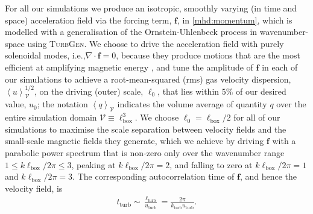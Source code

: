 \documentclass[12pt,twoside]{extreport}
\makeatletter
\newcommand{\mAve}[1]{\left\langle #1 \right\rangle} %
\newcommand{\mVector}[1]{\bm{#1}} %
\newcommand{\mVolume}{\ensuremath{\mathcal{V}}} %
\newcommand{\ie}{i.e.,\xspace} %
\providecommand{\DIFaddtex}[1]{{\protect\color{DIFgreen}\uwave{#1}}} %
\providecommand{\DIFdeltex}[1]{{\protect\color{DIFpurple}\sout{#1}}} %
\providecommand{\DIFaddbegin}{} %
\providecommand{\DIFaddend}{} %
\providecommand{\DIFdelbegin}{} %
\providecommand{\DIFdelend}{} %
\providecommand{\DIFadd}[1]{\texorpdfstring{\DIFaddtex{#1}}{#1}} %
\providecommand{\DIFdel}[1]{\texorpdfstring{\DIFdeltex{#1}}{}} %
\providecommand{\DIFscaledelfig}{0.5}
\newlength{\DIFdelgraphicswidth} %
\newlength{\DIFdelgraphicsheight} %
\providecommand{\DIFaddincludegraphics}[2][]{{\color{DIFgreen}\fbox{\DIFOincludegraphics[#1]{#2}}}} %
\providecommand{\DIFdelincludegraphics}[2][]{%
\sbox{\DIFdelgraphicsbox}{\DIFOincludegraphics[#1]{#2}}%
\settoboxwidth{\DIFdelgraphicswidth}{\DIFdelgraphicsbox} %
\settoboxtotalheight{\DIFdelgraphicsheight}{\DIFdelgraphicsbox} %
\scalebox{\DIFscaledelfig}{%
\parbox[b]{\DIFdelgraphicswidth}{\usebox{\DIFdelgraphicsbox}\\[-\baselineskip] \rule{\DIFdelgraphicswidth}{0em}}\llap{\resizebox{\DIFdelgraphicswidth}{\DIFdelgraphicsheight}{%
\setlength{\unitlength}{\DIFdelgraphicswidth}%
\begin{picture}(1,1)%
\thicklines\linethickness{2pt} %
{\color{DIFpurple}\put(0,0){\framebox(1,1){}}}%
{\color{DIFpurple}\put(0,0){\line( 1,1){1}}}%
{\color{DIFpurple}\put(0,1){\line(1,-1){1}}}%
\end{picture}%
}\hspace*{3pt}}} %
} %
\DeclareRobustCommand{\DIFaddbegin}{\DIFOaddbegin \let\includegraphics\DIFaddincludegraphics} %
\DeclareRobustCommand{\DIFaddend}{\DIFOaddend \let\includegraphics\DIFOincludegraphics} %
\DeclareRobustCommand{\DIFdelbegin}{\DIFOdelbegin \let\includegraphics\DIFdelincludegraphics} %
\DeclareRobustCommand{\DIFdelend}{\DIFOaddend \let\includegraphics\DIFOincludegraphics} %
\let\sout@orig\sout %
\renewcommand{\sout}[1]{\ifmmode\text{\sout@orig{\ensuremath{#1}}}\else\sout@orig{#1}\fi} %
\makeatother
\begin{document}
For all our simulations we produce an isotropic, smoothly varying (in time and space) acceleration field via the forcing term, $\mVector{f}$, in \autoref{mhd:momentum}, which is modelled with a generalisation of the Ornstein-Uhlenbeck process in wavenumber-space \citep{eswaran1988examination, schmidt2006numerical, schmidt2009numerical, federrath2010comparing, Federrath2022_TurbGen} using \textsc{TurbGen}. We choose to drive the acceleration field with purely solenoidal modes, \ie $\nabla\cdot\mVector{f} = 0$, because they produce motions that are the most efficient at amplifying magnetic energy \citep{federrath2011mach, federrath2014turbulent, martins2019kazantsev, chirakkara2021efficient}, and tune the amplitude of $\mVector{f}$ in each of our simulations to achieve a root-mean-squared (rms) gas velocity dispersion, $\mAve{u}_\mVolume^{1/2}$, on the driving (outer) scale, \DIFdelbegin \DIFdel{$\ell_0$}\DIFdelend \DIFaddbegin \DIFadd{$\ell_\mathrm{turb}$}\DIFaddend , that lies within $5\%$ of our desired value, \DIFdelbegin \DIFdel{$u_0$}\DIFdelend \DIFaddbegin \DIFadd{$u_\mathrm{turb}$}\DIFaddend ; the notation $\mAve{q}_{\mVolume}$ indicates the volume average of quantity $q$ over the entire simulation domain $\mVolume \equiv \ell_\mathrm{box}^3$. We choose \DIFdelbegin \DIFdel{$\ell_0 = \ell_\mathrm{box}/2$ }\DIFdelend \DIFaddbegin \DIFadd{$\ell_\mathrm{turb} = \ell_\mathrm{box}/2$ }\DIFaddend for all of our simulations to maximise the scale separation between velocity fields and the small-scale magnetic fields they generate, which we achieve by driving $\mVector{f}$ with a parabolic power spectrum that is non-zero only over the wavenumber range $1 \leq k \ell_\mathrm{box}/2\pi \leq 3$, peaking at $k \ell_\mathrm{box} / 2\pi = 2$, and falling to zero at $k \ell_\mathrm{box}/2\pi = 1$ and $k \ell_\mathrm{box}/2\pi = 3$. The corresponding autocorrelation time of $\mVector{f}$, and hence the velocity field, is
\DIFdelbegin %
\DIFdelend \DIFaddbegin \begin{align}
    t_\mathrm{turb}
        \sim \frac{\ell_\mathrm{turb}}{u_\mathrm{turb}}
        = \frac{2\pi}{k_\mathrm{turb} u_\mathrm{turb}} .
\end{align}\DIFaddend
\end{document}
